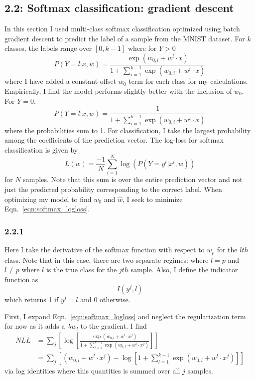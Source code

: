 \documentclass[12pt]{amsart}
\begin{document}
\subsection*{2.2: Softmax classification: gradient descent}

In this section I used multi-class softmax classification optimized using batch gradient descent to predict the label of a sample from the MNIST dataset.  For $k$ classes, the labels range over $[0,k-1]$ where for $Y > 0$
\begin{equation} \label{eqn:softmax_p}
P(Y = l | x, w) = \frac{\exp{(w_{0,l} + w^l \cdot x)}}{1 + \sum_{i = 1}^{k-1}\exp{(w_{0,i} + w^i \cdot x)}}
\end{equation}
where I have added a constant offset $w_0$ term for each class for my calculations.  Empirically, I find the model performs slightly better with the inclusion of $w_0$.  For $Y = 0$,
\begin{equation}
P(Y = l | x, w) = \frac{1}{1 + \sum_{i = 1}^{k-1}\exp{(w_{0,i} + w^i \cdot x)}}
\end{equation}
where the probabilities sum to 1.  For classification, I take the largest probability among the coefficients of the prediction vector.  The log-loss for softmax classification is given by 
\begin{equation} \label{eqn:softmax_logloss}
L(w) = \frac{-1}{N} \sum_{i = 1}^N \log(P(Y = y^i | x^i, w))
\end{equation} 
for $N$ samples.  Note that this sum is over the entire prediction vector and not just the predicted probability corresponding to the correct label.  When optimizing my model to find $w_0$ and $\hat{w}$, I seek to minimize Eqn.~\ref{eqn:softmax_logloss}.

\subsubsection*{2.2.1}

Here I take the derivative of the softmax function with respect to $w_p$ for the $lth$ class.  Note that in this case, there are two separate regimes:  where $l = p$ and $l \neq p$ where $l$ is the true class for the $jth$ sample.  Also, I define the indicator function as
\begin{equation} \label{eqn:indicator}
I(y^j, l)
\end{equation}
which returns 1 if $y^j = l$ and 0 otherwise.

First, I expand Eqn.~\ref{eqn:softmax_logloss} and neglect the regularization term for now as it adds a $\lambda w_l$ to the gradient. I find 
\begin{equation} \label{eqn:softmax_logloss_exp}
\begin{split}
NLL & = \sum_j \left[ \log \left[  \frac{\exp{(w_{0,l} + w^l \cdot x^j)}}{1 + \sum_{l = 1}^{k-1}\exp{(w_{0,l} + w^i \cdot x^j)}} \right]\right] \\
& = \sum_j \left[(w_{0,l} + w^l \cdot x^j) - \log[1 + \sum_{l = 1}^{k-1}\exp{(w_{0,l} + w^l \cdot x^j)}] \right]
\end{split}
\end{equation}
via log identities where this quantities is summed over all $j$ samples.
\end{document}
